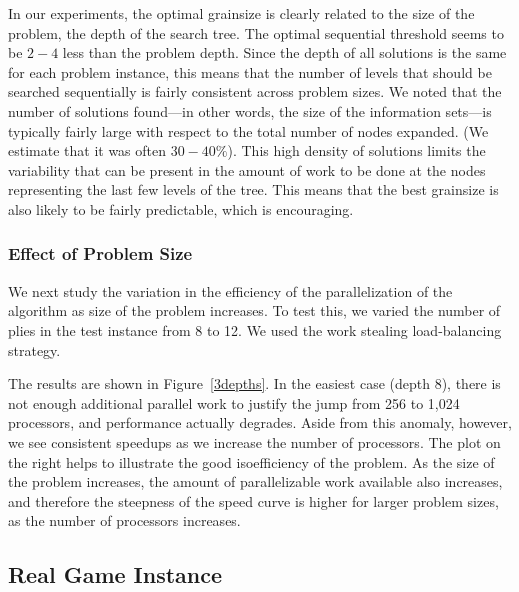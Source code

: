 \documentclass[10pt, conference, compsocconf]{IEEEtran}
\begin{document}
In our experiments, the optimal grainsize is clearly related to the size of the
problem, the depth of the search tree.  The optimal sequential threshold seems
to be $2-4$ less than the problem depth.  Since the depth of all solutions is
the same for each problem instance, this means that the number of levels that
should be searched sequentially is fairly consistent across problem sizes.  We
noted that the number of solutions found---in other words, the size of the
information sets---is typically fairly large with respect to the total number
of nodes expanded.  (We estimate that it was often $30-40\%$).  This high
density of solutions limits the variability that can be present in the amount
of work to be done at the nodes representing the last few levels of the tree.
This means that the best grainsize is also likely to be fairly predictable,
which is encouraging.  

\subsubsection{Effect of Problem Size}


We next study the variation in the efficiency of the parallelization of the
algorithm as size of the problem increases.  To test this, we varied the number
of plies in the test instance from 8 to 12. We used the work stealing
load-balancing strategy.  

The results are shown in Figure~\ref{3depths}.  In the easiest case (depth 8),
there is not enough additional parallel work to justify the jump from 256 to
1,024 processors, and performance actually degrades.  Aside from this anomaly,
however, we see consistent speedups as we increase the number of processors.
The plot on the right helps to illustrate the good isoefficiency of the
problem.  As the size of the problem increases, the amount of parallelizable
work available also increases, and therefore the steepness of the speed curve
is higher for larger problem sizes, as the number of processors increases.

\subsection{Real Game Instance}
%
%
%
%
%
\end{document}
